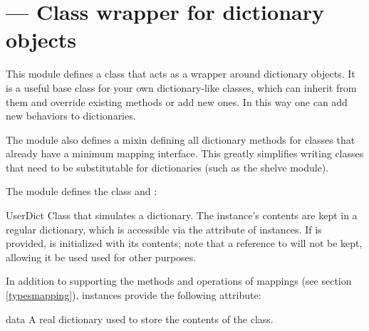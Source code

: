 \section{ ---
         Class wrapper for dictionary objects}



This module defines a class that acts as a wrapper around
dictionary objects.  It is a useful base class for
your own dictionary-like classes, which can inherit from
them and override existing methods or add new ones.  In this way one
can add new behaviors to dictionaries.

The module also defines a mixin defining all dictionary methods for
classes that already have a minimum mapping interface.  This greatly
simplifies writing classes that need to be substitutable for
dictionaries (such as the shelve module).

The  module defines the  class
and :

\begin{classdesc}{UserDict}{}
Class that simulates a dictionary.  The instance's
contents are kept in a regular dictionary, which is accessible via the
 attribute of  instances.  If
 is provided,  is initialized with its
contents; note that a reference to  will not be kept, 
allowing it be used used for other purposes.
\end{classdesc}

In addition to supporting the methods and operations of mappings (see
section \ref{typesmapping}),  instances provide the
following attribute:

\begin{memberdesc}{data}
A real dictionary used to store the contents of the 
class.
\end{memberdesc}

